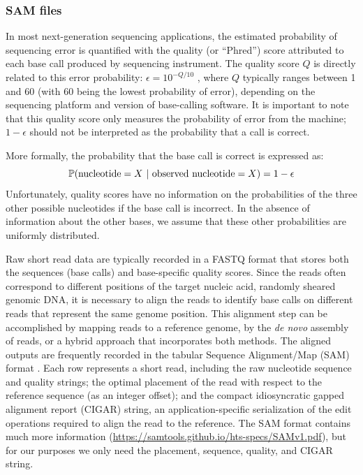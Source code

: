 \documentclass[10pt]{article}
\begin{document}
\subsubsection{SAM files}

In most next-generation sequencing applications, the estimated probability of sequencing error is quantified with the quality (or ``Phred'') score attributed to each base call produced by sequencing instrument.
The quality score $Q$ is directly related to this error probability: $\epsilon = 10^{-Q/10}$ \citep{ewingBaseCallingAutomatedSequencer1998}, where $Q$ typically ranges between 1 and 60 (with 60 being the lowest probability of error), depending on the sequencing platform and version of base-calling software.
It is important to note that this quality score only measures the probability of error from the machine; $1 - \epsilon$ should not be interpreted as the probability that a call is correct.

More formally, the probability that the base call is correct is expressed as: 
\begin{equation}
\label{eq:basecall}
\mathbb{P}(\text{nucleotide}=X \,\,|\,\, \text{observed nucleotide} = X) = 1 - \epsilon
\end{equation}
Unfortunately, quality scores have no information on the probabilities of the three other possible nucleotides if the base call is incorrect.
In the absence of information about the other bases, we assume that these other probabilities are uniformly distributed.


Raw short read data are typically recorded in a FASTQ format that stores both the sequences (base calls) and base-specific quality scores.
Since the reads often correspond to different positions of the target nucleic acid, \eg randomly sheared genomic DNA, it is necessary to align the reads to identify base calls on different reads that represent the same genome position.
This alignment step can be accomplished by mapping reads to a reference genome, by the \emph{de novo} assembly of reads, or a hybrid approach that incorporates both methods.
The aligned outputs are frequently recorded in the tabular Sequence Alignment/Map (SAM) format \citep{liSequenceAlignmentMap2009}.
Each row represents a short read, including the raw nucleotide sequence and quality strings; the optimal placement of the read with respect to the reference sequence (as an integer offset); and the compact idiosyncratic gapped alignment report (CIGAR) string, an application-specific serialization of the edit operations required to align the read to the reference.
The SAM format contains much more information (\url{https://samtools.github.io/hts-specs/SAMv1.pdf}), but for our purposes we only need the placement, sequence, quality, and CIGAR string.
\end{document}
